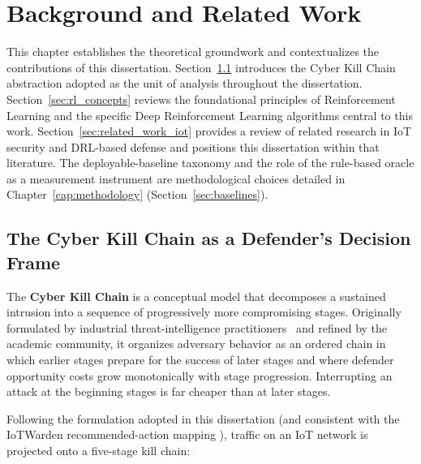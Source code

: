 \chapter{Background and Related Work}\label{cap:background}

This chapter establishes the theoretical groundwork and contextualizes the contributions of this dissertation. Section~\ref{sec:kill_chain} introduces the Cyber Kill Chain abstraction adopted as the unit of analysis throughout the dissertation. Section~\ref{sec:rl_concepts} reviews the foundational principles of Reinforcement Learning and the specific Deep Reinforcement Learning algorithms central to this work. Section~\ref{sec:related_work_iot} provides a review of related research in IoT security and DRL-based defense and positions this dissertation within that literature. The deployable-baseline taxonomy and the role of the rule-based oracle as a measurement instrument are methodological choices detailed in Chapter~\ref{cap:methodology} (Section~\ref{sec:baselines}).

\section{The Cyber Kill Chain as a Defender's Decision Frame}\label{sec:kill_chain}
The \textbf{Cyber Kill Chain} \cite{Hutchins2011,Naik2022} is a conceptual model that decomposes a sustained intrusion into a sequence of progressively more compromising stages. Originally formulated by industrial threat-intelligence practitioners~\cite{Hutchins2011} and refined by the academic community, it organizes adversary behavior as an ordered chain in which earlier stages prepare for the success of later stages and where defender opportunity costs grow monotonically with stage progression. Interrupting an attack at the beginning stages is far cheaper than at later stages.

Following the formulation adopted in this dissertation (and consistent with the IoTWarden recommended-action mapping \cite{Alam2024}), traffic on an IoT network is projected onto a five-stage kill chain:

